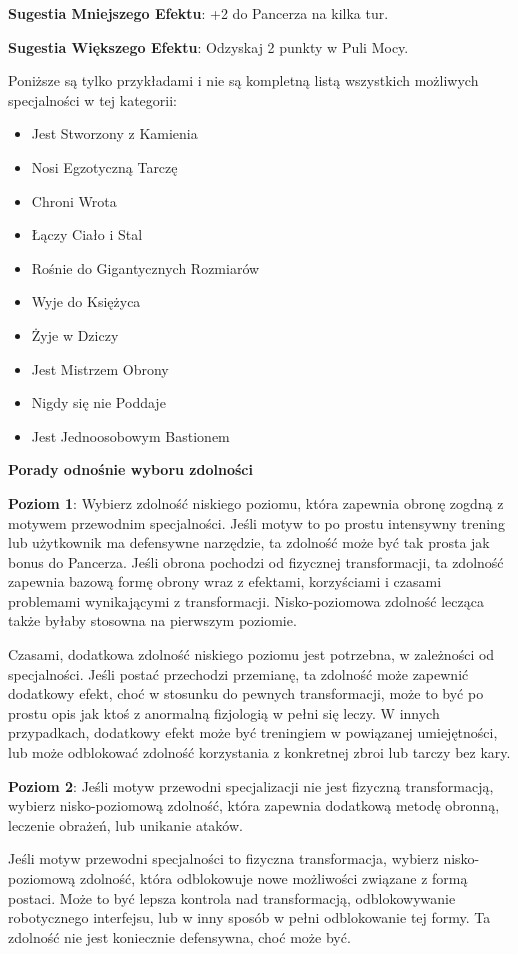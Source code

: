 \textbf{Sugestia Mniejszego Efektu}: +2 do Pancerza na kilka tur.

\textbf{Sugestia Większego Efektu}: Odzyskaj 2 punkty w Puli Mocy.

Poniższe są tylko przykładami i nie są kompletną listą wszystkich możliwych specjalności w tej kategorii:

\begin{itemize}
\item Jest Stworzony z Kamienia
\item Nosi Egzotyczną Tarczę
\item Chroni Wrota
\item Łączy Ciało i Stal
\item Rośnie do Gigantycznych Rozmiarów
\item Wyje do Księżyca
\item Żyje w Dziczy
\item Jest Mistrzem Obrony
\item Nigdy się nie Poddaje
\item Jest Jednoosobowym Bastionem
\end{itemize}

\textbf{Porady odnośnie wyboru zdolności}

\textbf{Poziom 1}: Wybierz zdolność niskiego poziomu, która zapewnia obronę zogdną z motywem przewodnim specjalności. Jeśli motyw to po prostu intensywny trening lub użytkownik ma defensywne narzędzie, ta zdolność może być tak prosta jak bonus do Pancerza. Jeśli obrona pochodzi od fizycznej transformacji, ta zdolność zapewnia bazową formę obrony wraz z efektami, korzyściami i czasami problemami wynikającymi z transformacji. Nisko-poziomowa zdolność lecząca także byłaby stosowna na pierwszym poziomie.

Czasami, dodatkowa zdolność niskiego poziomu jest potrzebna, w zależności od specjalności. Jeśli postać przechodzi przemianę, ta zdolność może zapewnić dodatkowy efekt, choć w stosunku do pewnych transformacji, może to być po prostu opis jak ktoś z anormalną fizjologią w pełni się leczy. W innych przypadkach, dodatkowy efekt może być treningiem w powiązanej umiejętności, lub może odblokować zdolność korzystania z konkretnej zbroi lub tarczy bez kary.

\textbf{Poziom 2}: Jeśli motyw przewodni specjalizacji nie jest fizyczną transformacją, wybierz nisko-poziomową zdolność, która zapewnia dodatkową metodę obronną, leczenie obrażeń, lub unikanie ataków.

Jeśli motyw przewodni specjalności to fizyczna transformacja, wybierz nisko-poziomową zdolność, która odblokowuje nowe możliwości związane z formą postaci. Może to być lepsza kontrola nad transformacją, odblokowywanie robotycznego interfejsu, lub w inny sposób w pełni odblokowanie tej formy. Ta zdolność nie jest koniecznie defensywna, choć może być.

